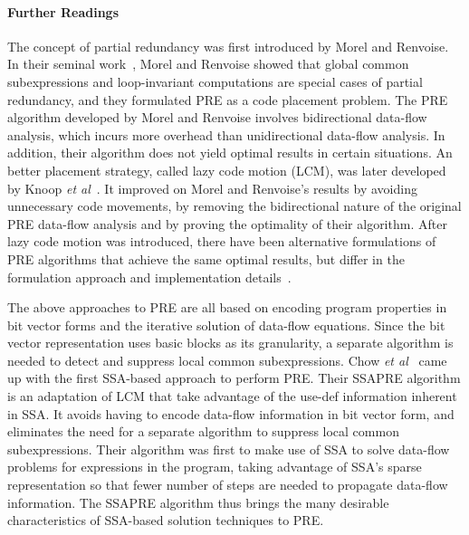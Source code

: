 \paragraph{Further Readings}
\label{sec:ssapre:related}
The concept of partial redundancy was first introduced by Morel and Renvoise. 
In their seminal work~\cite{MR79}, Morel and Renvoise showed that global common subexpressions and loop-invariant computations are special cases of partial redundancy, and they formulated PRE as a code placement problem. 
The PRE algorithm developed by Morel and Renvoise involves bidirectional data-flow analysis, which incurs more overhead than unidirectional data-flow analysis. 
In addition, their algorithm does not yield optimal results in certain situations. 
An better placement strategy, called lazy code motion (LCM), was later developed by Knoop {\it et al}~\cite{Knoop92,Knoop94}. 
It improved on Morel and Renvoise's results by avoiding unnecessary code movements, by removing the bidirectional nature of the original PRE data-flow analysis and by proving the optimality of their algorithm. 
After lazy code motion was introduced, there have been alternative formulations of PRE algorithms that achieve the same optimal results, but differ in the formulation approach and implementation details~\cite{DS93,Dhamdhere02,Paleri03,XueKnoop06}.

The above approaches to PRE are all based on encoding program properties in bit vector forms and the iterative solution of data-flow equations. 
Since the bit vector representation uses basic blocks as its granularity, a separate algorithm is needed to detect and suppress local common subexpressions. 
Chow {\it et al}~\cite{Chow97,Kennedy99} came up with the first SSA-based approach to perform PRE. 
Their SSAPRE algorithm is an adaptation of LCM that take advantage of the use-def information inherent in SSA. 
It avoids having to encode data-flow information in bit vector form, and eliminates the need for a separate algorithm to suppress local common subexpressions. 
Their algorithm was first to make use of SSA to solve data-flow problems for expressions in the program, taking advantage of SSA's sparse representation so that fewer number of steps are needed to propagate data-flow information. 
The SSAPRE algorithm thus brings the many desirable characteristics of SSA-based solution techniques to PRE.

